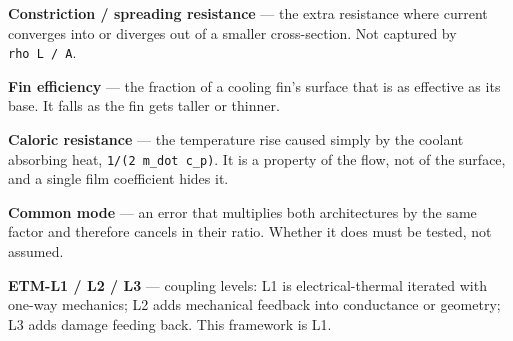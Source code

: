 \documentclass[10pt,]{article}
\begin{document}
\textbf{Constriction / spreading resistance} --- the extra resistance
where current converges into or diverges out of a smaller cross-section.
Not captured by \texttt{rho\ L\ /\ A}.

\textbf{Fin efficiency} --- the fraction of a cooling fin's surface that
is as effective as its base. It falls as the fin gets taller or thinner.

\textbf{Caloric resistance} --- the temperature rise caused simply by
the coolant absorbing heat, \texttt{1/(2\ m\_dot\ c\_p)}. It is a
property of the flow, not of the surface, and a single film coefficient
hides it.

\textbf{Common mode} --- an error that multiplies both architectures by
the same factor and therefore cancels in their ratio. Whether it does
must be tested, not assumed.

\textbf{ETM-L1 / L2 / L3} --- coupling levels: L1 is electrical-thermal
iterated with one-way mechanics; L2 adds mechanical feedback into
conductance or geometry; L3 adds damage feeding back. This framework is
L1.
\end{document}
